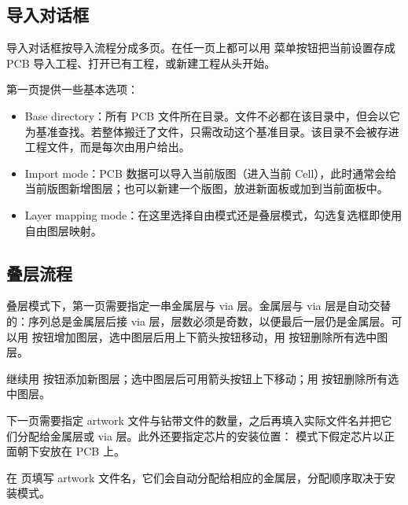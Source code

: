 \subsection{导入对话框}

导入对话框按导入流程分成多页。在任一页上都可以用  菜单按钮把当前设置存成 PCB 导入工程、打开已有工程，或新建工程从头开始。


第一页提供一些基本选项：

\begin{itemize}
\item Base directory：所有 PCB 文件所在目录。文件不必都在该目录中，但会以它为基准查找。若整体搬迁了文件，只需改动这个基准目录。该目录不会被存进工程文件，而是每次由用户给出。
\item Import mode：PCB 数据可以导入当前版图（进入当前 Cell），此时通常会给当前版图新增图层；也可以新建一个版图，放进新面板或加到当前面板中。
\item Layer mapping mode：在这里选择自由模式还是叠层模式，勾选复选框即使用自由图层映射。
\end{itemize}

\subsection{叠层流程}


叠层模式下，第一页需要指定一串金属层与 via 层。金属层与 via 层是自动交替的：序列总是金属层后接 via 层，层数必须是奇数，以便最后一层仍是金属层。可以用 \ui{+} 按钮增加图层，选中图层后用上下箭头按钮移动，用  按钮删除所有选中图层。

继续用 \ui{+} 按钮添加新图层；选中图层后可用箭头按钮上下移动；用  按钮删除所有选中图层。


下一页需要指定 artwork 文件与钻带文件的数量，之后再填入实际文件名并把它们分配给金属层或 via 层。此外还要指定芯片的安装位置： 模式下假定芯片以正面朝下安放在 PCB 上。


在  页填写 artwork 文件名，它们会自动分配给相应的金属层，分配顺序取决于安装模式。

